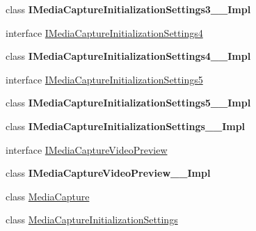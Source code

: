 \begin{DoxyCompactItemize}
\item 
class {\bfseries I\+Media\+Capture\+Initialization\+Settings3\+\_\+\+\_\+\+Impl}
\item 
interface \hyperlink{interface_windows_1_1_media_1_1_capture_1_1_i_media_capture_initialization_settings4}{I\+Media\+Capture\+Initialization\+Settings4}
\item 
class {\bfseries I\+Media\+Capture\+Initialization\+Settings4\+\_\+\+\_\+\+Impl}
\item 
interface \hyperlink{interface_windows_1_1_media_1_1_capture_1_1_i_media_capture_initialization_settings5}{I\+Media\+Capture\+Initialization\+Settings5}
\item 
class {\bfseries I\+Media\+Capture\+Initialization\+Settings5\+\_\+\+\_\+\+Impl}
\item 
class {\bfseries I\+Media\+Capture\+Initialization\+Settings\+\_\+\+\_\+\+Impl}
\item 
interface \hyperlink{interface_windows_1_1_media_1_1_capture_1_1_i_media_capture_video_preview}{I\+Media\+Capture\+Video\+Preview}
\item 
class {\bfseries I\+Media\+Capture\+Video\+Preview\+\_\+\+\_\+\+Impl}
\item 
class \hyperlink{class_windows_1_1_media_1_1_capture_1_1_media_capture}{Media\+Capture}
\item 
class \hyperlink{class_windows_1_1_media_1_1_capture_1_1_media_capture_initialization_settings}{Media\+Capture\+Initialization\+Settings}
\end{DoxyCompactItemize}
